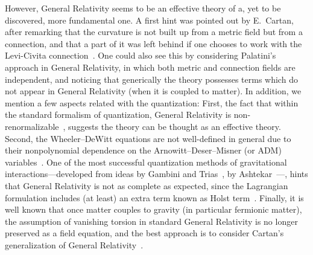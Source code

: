 \documentclass[aps,prd,12pt,twocolumn,superscriptaddress,showpacs,showkeys,reprint%
]{revtex4-1}
\renewcommand{\(}{\left(}
\renewcommand{\)}{\right)}
\renewcommand{\[}{\left[}
\renewcommand{\]}{\right]}
\begin{document}
However, General Relativity seems to be an effective theory of a, yet to be discovered, more fundamental one. A first hint was pointed out by E.~Cartan, after remarking that the curvature is not built up from a metric field but from a connection, and that a part of it was left behind if one chooses to work with the Levi-Civita connection~\cite{Cartan1922,Cartan1923,Cartan1924,Cartan1925}. One could also see this by considering Palatini's approach in General Relativity, in which both metric and connection fields are independent, and noticing that generically the theory possesses terms which do not appear in General Relativity (when it is coupled to matter). In addition, we mention a few aspects related with the quantization: First, the fact that within the standard formalism of quantization, General Relativity is non-renormalizable~\cite{'tHooft:1973us,'tHooft:1974bx,Deser:1974cz,Deser:1974cy}, suggests the theory can be thought as an effective theory. Second, the Wheeler--DeWitt equations are not well-defined in general due to their nonpolynomial dependence on the Arnowitt--Deser--Misner (or ADM) variables~\cite{Arnowitt:1959ah,Arnowitt:1960es,WheelerGeo,DeWitt:1967yk,DeWitt:1967ub,DeWitt:1967uc}. One of the most successful quantization methods of gravitational interactions---developed from ideas by Gambini and Trias~\cite{Gambini:1980yz,Gambini:1986ew}, by Ashtekar~\cite{Ashtekar:1986yd,Ashtekar:1987gu}---, hints that General Relativity is not as complete as expected, since the Lagrangian formulation includes (at least) an extra term known as Holst term~\cite{Holst:1995pc}. Finally, it is well known that once matter couples to gravity (in particular fermionic matter), the assumption of vanishing torsion in standard General Relativity is no longer preserved as a field equation, and the best approach is to consider Cartan's generalization of General Relativity~\cite{Kibble:1961ba,Hehl:1976kj,Shapiro:2001rz,Hammond:2002rm}.
\end{document}
